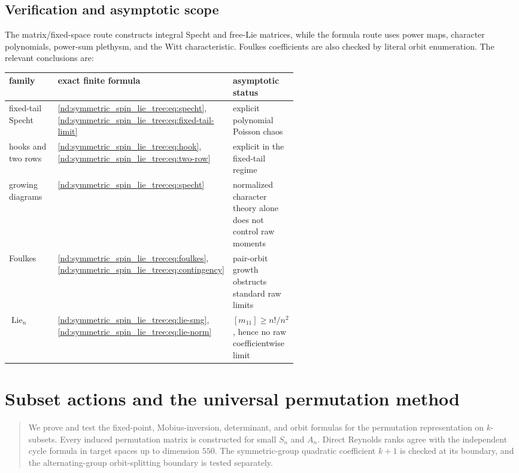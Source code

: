 \documentclass[10pt]{article}
\newcommand{\Sym}{\operatorname{Sym}}
\newcommand{\Fix}{\operatorname{Fix}}
\newcommand{\Lie}{\operatorname{Lie}}
\begin{document}
\subsection{Verification and asymptotic scope}

The matrix/fixed-space route constructs integral Specht and free-Lie matrices,
while the formula route uses power maps, character polynomials, power-sum
plethysm, and the Witt characteristic.  Foulkes coefficients are also checked
by literal orbit enumeration.  The relevant conclusions are:
\begin{center}
\small
\begin{tabularx}{\linewidth}{@{}>{\raggedright\arraybackslash}p{0.27\linewidth}
>{\raggedright\arraybackslash}p{0.29\linewidth}X@{}}\toprule
family&exact finite formula&asymptotic status\\\midrule
fixed-tail Specht&\eqref{nd:symmetric_spin_lie_tree:eq:specht},
\eqref{nd:symmetric_spin_lie_tree:eq:fixed-tail-limit}&explicit polynomial Poisson chaos\\
hooks and two rows&\eqref{nd:symmetric_spin_lie_tree:eq:hook},
\eqref{nd:symmetric_spin_lie_tree:eq:two-row}&explicit in the fixed-tail regime\\
growing diagrams&\eqref{nd:symmetric_spin_lie_tree:eq:specht}&normalized character theory alone does not control raw moments\\
Foulkes&\eqref{nd:symmetric_spin_lie_tree:eq:foulkes},
\eqref{nd:symmetric_spin_lie_tree:eq:contingency}&pair-orbit growth obstructs standard raw limits\\
$\Lie_n$&\eqref{nd:symmetric_spin_lie_tree:eq:lie-smg},
\eqref{nd:symmetric_spin_lie_tree:eq:lie-norm}&$[m_{11}]\ge n!/n^2$, hence no raw coefficientwise limit\\\bottomrule
\end{tabularx}
\end{center}

\clearpage
\section{Subset actions and the universal permutation method}\label{proof:subset-actions}
\begingroup
\providecommand{\Sym}{\operatorname{Sym}}
\renewcommand{\Sym}{\operatorname{Sym}}
\providecommand{\Fix}{\operatorname{Fix}}
\renewcommand{\Fix}{\operatorname{Fix}}
\setcounter{theorem}{0}
\setcounter{proposition}{0}
\setcounter{lemma}{0}
\setcounter{corollary}{0}
\setcounter{remark}{0}
\begin{abstract}
We prove and test the fixed-point, Mobius-inversion, determinant, and orbit
formulas for the permutation representation on $k$-subsets.  Every induced
permutation matrix is constructed for small $S_n$ and $A_n$.  Direct Reynolds
ranks agree with the independent cycle formula in target spaces up to dimension
$550$.  The symmetric-group quadratic coefficient $k+1$ is checked at its
boundary, and the alternating-group orbit-splitting boundary is tested
separately.
\end{abstract}
\end{document}
